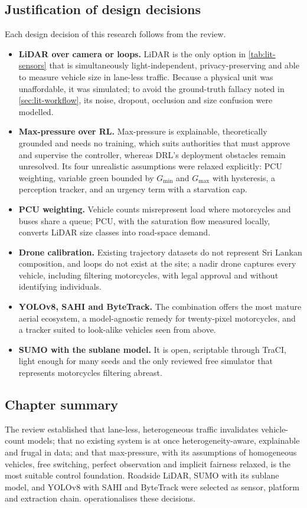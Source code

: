 \subsection{Justification of design decisions}
Each design decision of this research follows from the review.
\begin{itemize}[leftmargin=*,itemsep=2pt]
  \item \textbf{LiDAR over camera or loops.} LiDAR is the only option in \cref{tab:lit-sensors} that is
        simultaneously light-independent, privacy-preserving and able to measure vehicle size in lane-less
        traffic. Because a physical unit was unaffordable, it was simulated; to avoid the ground-truth fallacy
        noted in \cref{sec:lit-workflow}, its noise, dropout, occlusion and size confusion were modelled.
  \item \textbf{Max-pressure over RL.} Max-pressure is explainable, theoretically grounded and needs no training,
        which suits authorities that must approve and supervise the controller, whereas DRL's deployment
        obstacles remain unresolved. Its four unrealistic assumptions were relaxed explicitly: PCU weighting,
        variable green bounded by $G_{\min}$ and $G_{\max}$ with hysteresis, a perception tracker, and an
        urgency term with a starvation cap.
  \item \textbf{PCU weighting.} Vehicle counts misrepresent load where motorcycles and buses share a queue; PCU,
        with the saturation flow measured locally, converts LiDAR size classes into road-space demand.
  \item \textbf{Drone calibration.} Existing trajectory datasets do not represent Sri Lankan composition, and
        loops do not exist at the site; a nadir drone captures every vehicle, including filtering motorcycles,
        with legal approval and without identifying individuals.
  \item \textbf{YOLOv8, SAHI and ByteTrack.} The combination offers the most mature aerial ecosystem, a
        model-agnostic remedy for twenty-pixel motorcycles, and a tracker suited to look-alike vehicles seen from
        above.
  \item \textbf{SUMO with the sublane model.} It is open, scriptable through TraCI, light enough for many seeds
        and the only reviewed free simulator that represents motorcycles filtering abreast.
\end{itemize}

\subsection{Chapter summary}
The review established that lane-less, heterogeneous traffic invalidates vehicle-count models; that no
existing system is at once heterogeneity-aware, explainable and frugal in data; and that max-pressure, with its
assumptions of homogeneous vehicles, free switching, perfect observation and implicit fairness relaxed, is the
most suitable control foundation. Roadside LiDAR, SUMO with its sublane model, and YOLOv8 with SAHI and
ByteTrack were selected as sensor, platform and extraction chain.  operationalises these
decisions.
